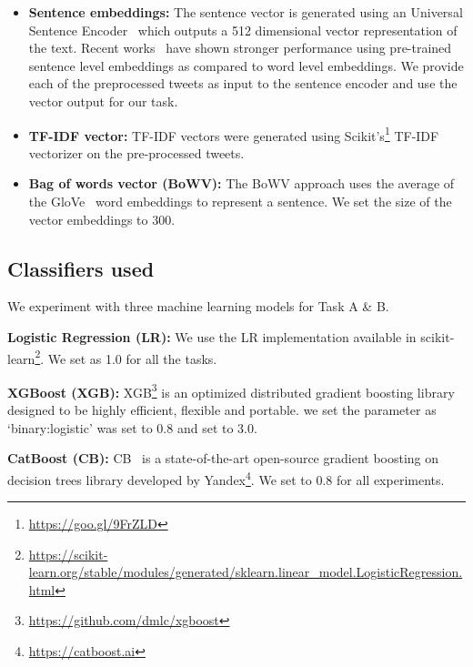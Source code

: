 \documentclass[11pt]{article}
\begin{document}
  
\begin{itemize}
    \item \textbf{Sentence embeddings:}
The sentence vector is generated using an Universal Sentence Encoder~\cite{cer2018universal} which outputs a 512 dimensional vector representation of the text. Recent works~\cite{conneau2017supervised} have shown stronger performance using pre-trained sentence level embeddings as compared to word level embeddings. We provide each of the preprocessed tweets as input to the sentence encoder and use the vector output for our task.

\item \textbf{TF-IDF vector: }
TF-IDF vectors were generated using Scikit's\footnote{\url{https://goo.gl/9FrZLD}} TF-IDF vectorizer on the pre-processed tweets.

\item \textbf{Bag of words vector (BoWV): }
The BoWV approach uses the average of the GloVe~\cite{pennington2014glove} word embeddings to represent a sentence. We set the size of the vector embeddings to 300.

\end{itemize}











\subsection{Classifiers used} 
We experiment with three machine learning models for Task A \& B.

\noindent\textbf{Logistic Regression (LR):} We use the LR implementation available in scikit-learn\footnote{\url{https://scikit-learn.org/stable/modules/generated/sklearn.linear_model.LogisticRegression.html}}. We set  as 1.0 for all the tasks.

\noindent\textbf{XGBoost (XGB):} XGB\footnote{\url{https://github.com/dmlc/xgboost}} is an optimized distributed gradient boosting library designed to be highly efficient, flexible and portable. we set the  parameter as `binary:logistic'  was set to 0.8 and  set to 3.0.

\noindent\textbf{CatBoost (CB):}
CB~\cite{dorogush2017catboost} is a state-of-the-art open-source gradient boosting on decision trees library developed by Yandex\footnote{\url{https://catboost.ai}}. We set  to 0.8 for all experiments.
\end{document}
